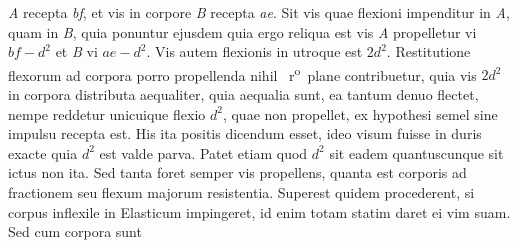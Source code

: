 %
\textit{A} recepta\protect{} \textit{bf}, et vis in corpore \textit{B} recepta\protect{} \textit{ae}. 
Sit %
%
vis quae flexioni\protect{} impenditur 
%
%
in \textit{A}, quam in \textit{B}, quia ponuntur ejusdem
%
 quia ergo reliqua est vis
%
%
\textit{A} propelletur vi 
%
$bf-d^2$ et \textit{B} vi $ae - d^2$.
%
Vis autem flexionis\protect{} in utroque est $2d^2$.
%
Restitutione flexorum ad corpora porro propellenda nihil 
~r\textsuperscript{o}\rbrack\
plane contribuetur, quia vis $2d^2$ in corpora distributa aequaliter, quia aequalia sunt,
ea tantum denuo flectet, nempe reddetur unicuique flexio\protect{} $d^2$, quae non propellet,
%
ex hypothesi semel sine impulsu recepta est. His
ita positis dicendum esset, ideo visum fuisse in duris
%
%
exacte
quia $d^2$ est valde parva. Patet etiam quod $d^2$ sit eadem quantuscunque sit ictus
%
%
non ita. Sed tanta foret semper vis propellens\protect{}, quanta est corporis
ad fractionem\protect{} seu flexum majorum resistentia\protect{}.
\pend\pstart
Superest  quidem procederent, si corpus inflexile\protect{} in Elasticum\protect{} 
impingeret, id enim totam statim daret ei vim suam. Sed cum corpora sunt

